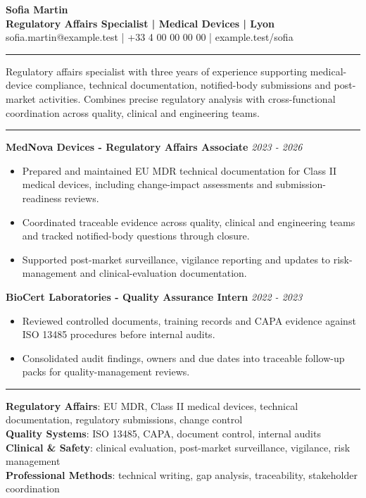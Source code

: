 \documentclass[10pt,a4paper]{article}
\newcommand{\cvsection}[1]{\vspace{5pt}{\large\textbf{#1}}\par\vspace{2pt}\hrule\vspace{3pt}}
\begin{document}
\begin{center}
{\Large \textbf{Sofia Martin}}\\[2pt]
\textbf{Regulatory Affairs Specialist | Medical Devices | Lyon}\\[2pt]
sofia.martin@example.test | +33 4 00 00 00 00 | example.test/sofia
\end{center}

\cvsection{Profile}
Regulatory affairs specialist with three years of experience supporting medical-device compliance, technical documentation, notified-body submissions and post-market activities. Combines precise regulatory analysis with cross-functional coordination across quality, clinical and engineering teams.

\cvsection{Experience}
\textbf{MedNova Devices - Regulatory Affairs Associate} \hfill \textit{2023 - 2026}
\begin{itemize}
\item Prepared and maintained EU MDR technical documentation for Class II medical devices, including change-impact assessments and submission-readiness reviews.
\item Coordinated traceable evidence across quality, clinical and engineering teams and tracked notified-body questions through closure.
\item Supported post-market surveillance, vigilance reporting and updates to risk-management and clinical-evaluation documentation.
\end{itemize}
\textbf{BioCert Laboratories - Quality Assurance Intern} \hfill \textit{2022 - 2023}
\begin{itemize}
\item Reviewed controlled documents, training records and CAPA evidence against ISO 13485 procedures before internal audits.
\item Consolidated audit findings, owners and due dates into traceable follow-up packs for quality-management reviews.
\end{itemize}

\cvsection{Skills}
\textbf{Regulatory Affairs}: EU MDR, Class II medical devices, technical documentation, regulatory submissions, change control\\
\textbf{Quality Systems}: ISO 13485, CAPA, document control, internal audits\\
\textbf{Clinical \& Safety}: clinical evaluation, post-market surveillance, vigilance, risk management\\
\textbf{Professional Methods}: technical writing, gap analysis, traceability, stakeholder coordination
\end{document}
